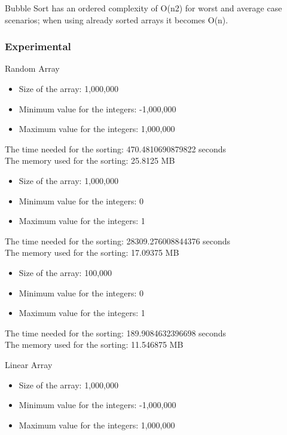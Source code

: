 \documentclass{article}
\begin{document}
Bubble Sort has an ordered complexity of O(n2) for worst and average case scenarios; when using already sorted arrays it becomes O(n).

\subsubsection{Experimental}

Random Array

\begin{itemize}
  \item Size of the array: 1,000,000
  \item Minimum value for the integers: -1,000,000
  \item Maximum value for the integers: 1,000,000
\end{itemize}

The time needed for the sorting: 470.4810690879822 seconds \\
The memory used for the sorting: 25.8125 MB

\begin{itemize}
  \item Size of the array: 1,000,000
  \item Minimum value for the integers: 0
  \item Maximum value for the integers: 1
\end{itemize}

The time needed for the sorting: 28309.276008844376 seconds \\
The memory used for the sorting: 17.09375 MB

\begin{itemize}
  \item Size of the array: 100,000
  \item Minimum value for the integers: 0
  \item Maximum value for the integers: 1
\end{itemize}

The time needed for the sorting: 189.9084632396698 seconds \\
The memory used for the sorting: 11.546875 MB

\vspace{0.5cm}

Linear Array

\begin{itemize}
  \item Size of the array: 1,000,000
  \item Minimum value for the integers: -1,000,000
  \item Maximum value for the integers: 1,000,000
\end{itemize}
\end{document}
